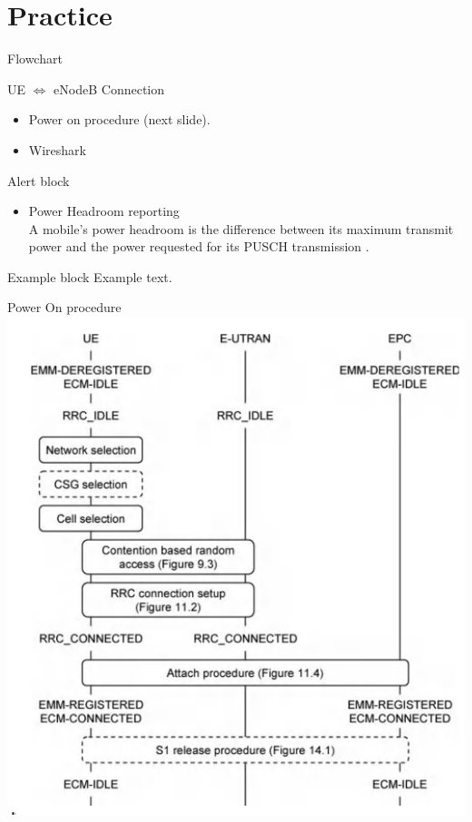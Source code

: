 \documentclass{beamer}
\begin{document}
\section{Practice}


\begin{frame}{Flowchart}
	\begin{block}{UE $\iff$ eNodeB Connection}
		\begin{itemize}
		    \item Power on procedure (next slide).
		    \item Wireshark
		\end{itemize}
	\end{block}
	\pause %
	\begin{block}{Alert block}
		\begin{itemize}
		    \item Power Headroom reporting \\ A mobile's power headroom is the difference between its maximum transmit power and the power requested for its PUSCH transmission .
		\end{itemize}
	\end{block}
	\pause %
	\begin{exampleblock}{Example block}
		Example \textcolor{example}{text}.
	\end{exampleblock}
\end{frame}
\begin{frame}{Power On procedure}
    \includegraphics[width=\textwidth,height=\textheight,keepaspectratio]{power_on_sequence.png}

\end{frame}
\end{document}
